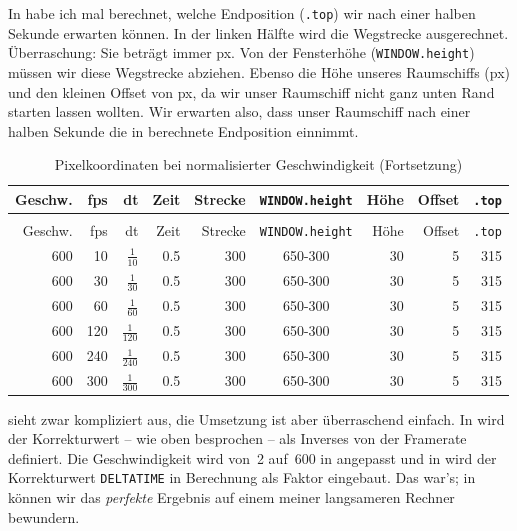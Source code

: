 In  habe ich mal berechnet, welche Endposition (\texttt{.top}) wir nach einer halben Sekunde erwarten können. In der linken Hälfte wird die Wegstrecke ausgerechnet. Überraschung: Sie beträgt immer \unit[300]{px}. Von der Fensterhöhe (\texttt{WINDOW.height}) müssen wir diese Wegstrecke abziehen. Ebenso die Höhe unseres Raumschiffs (\unit[30]{px}) und den kleinen Offset von \unit[5]{px}, da wir unser Raumschiff nicht ganz unten Rand starten lassen wollten. Wir erwarten also, dass unser Raumschiff nach einer halben Sekunde die in  berechnete Endposition einnimmt.


\begin{longtable}{r@{ * }r@{ * }r@{ * }r@{ = }r@{ $\rightarrow$ }c@{ - }r@{ - }r@{ = }r}%
	\caption{Pixelkoordinaten bei normalisierter Geschwindigkeit}\label{tabFpsBewegung03} \\[1em]
    Geschw. & fps & dt  & Zeit  & Strecke & \texttt{WINDOW.height} & Höhe & Offset & \texttt{.top}\\[0.5em]\hline\hline
	\hline
	\endfirsthead %
	\caption{Pixelkoordinaten bei normalisierter Geschwindigkeit (Fortsetzung)}\\[1em]
    Geschw. & fps & dt  & Zeit  & Strecke & \texttt{WINDOW.height} & Höhe & Offset & \texttt{.top}\\[0.5em]\hline\hline
	\hline
	\endhead %
	600  &   10 &  $\frac{1}{10}$   & 0.5 & 300 & 650-300 & 30 & 5 & 315 \\ \hline
	600  &   30 &  $\frac{1}{30}$   & 0.5 & 300 & 650-300 & 30 & 5 & 315 \\ \hline
	600  &   60 &  $\frac{1}{60}$   & 0.5 & 300 & 650-300 & 30 & 5 & 315 \\ \hline
	600  &  120 &  $\frac{1}{120}$  & 0.5 & 300 & 650-300 & 30 & 5 & 315 \\ \hline
	600  &  240 &  $\frac{1}{240}$  & 0.5 & 300 & 650-300 & 30 & 5 & 315 \\ \hline
	600  &  300 &  $\frac{1}{300}$  & 0.5 & 300 & 650-300 & 30 & 5 & 315 \\ \hline
\end{longtable} 

 sieht zwar kompliziert aus, die Umsetzung ist aber überraschend einfach. In  wird der Korrekturwert -- wie oben besprochen -- als Inverses von der Framerate definiert. Die Geschwindigkeit wird von~2 auf~600 in  angepasst und in  wird der Korrekturwert \texttt{DELTATIME} in Berechnung als Faktor eingebaut. Das war's; in  können wir das \emph{perfekte} Ergebnis auf einem meiner langsameren Rechner bewundern. 


